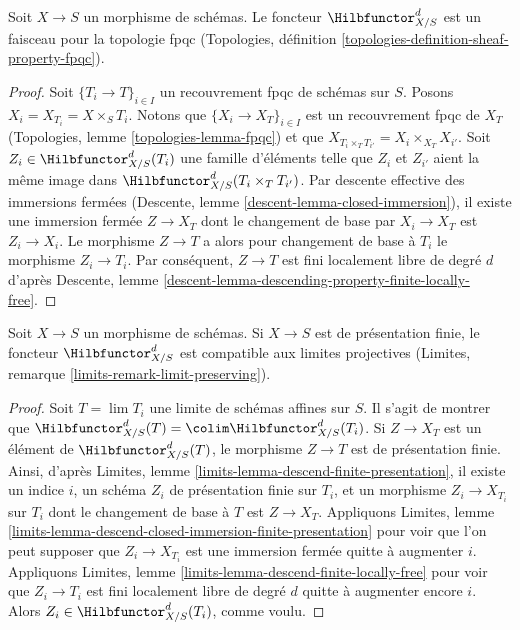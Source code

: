 \begin{lemma}
\label{lemma-hilb-d-sheaf}
Soit $X \to S$ un morphisme de schémas. Le foncteur $\Hilbfunctor^d_{X/S}$
est un faisceau pour la topologie fpqc
(Topologies, définition \ref{topologies-definition-sheaf-property-fpqc}).
\end{lemma}

\begin{proof}
Soit $\{T_i \to T\}_{i \in I}$ un recouvrement fpqc de schémas sur $S$.
Posons $X_i = X_{T_i} = X \times_S T_i$.
Notons que $\{X_i \to X_T\}_{i \in I}$ est un recouvrement fpqc de
$X_T$ (Topologies, lemme \ref{topologies-lemma-fpqc})
et que $X_{T_i \times_T T_{i'}} = X_i \times_{X_T} X_{i'}$.
Soit $Z_i \in \Hilbfunctor^d_{X/S}(T_i)$ une famille
d'éléments telle que $Z_i$ et $Z_{i'}$ aient la même image dans
$\Hilbfunctor^d_{X/S}(T_i \times_T T_{i'})$. Par descente effective
des immersions fermées (Descente, lemme \ref{descent-lemma-closed-immersion}),
il existe une immersion fermée $Z \to X_T$ dont le changement de base par
$X_i \to X_T$ est $Z_i \to X_i$. Le morphisme $Z \to T$
a alors pour changement de base à $T_i$ le morphisme
$Z_i \to T_i$. Par conséquent, $Z \to T$ est fini localement libre de degré $d$
d'après Descente, lemme \ref{descent-lemma-descending-property-finite-locally-free}.
\end{proof}

\begin{lemma}
\label{lemma-hilb-d-limit-preserving}
Soit $X \to S$ un morphisme de schémas. Si $X \to S$ est
de présentation finie, le foncteur $\Hilbfunctor^d_{X/S}$
est compatible aux limites projectives (Limites, remarque \ref{limits-remark-limit-preserving}).
\end{lemma}

\begin{proof}
Soit $T = \lim T_i$ une limite de schémas affines sur $S$. Il s'agit de montrer
que $\Hilbfunctor^d_{X/S}(T) = \colim \Hilbfunctor^d_{X/S}(T_i)$.
Si $Z \to X_T$ est un élément de $\Hilbfunctor^d_{X/S}(T)$,
le morphisme $Z \to T$ est de présentation finie. Ainsi, d'après
Limites, lemme \ref{limits-lemma-descend-finite-presentation},
il existe un indice $i$, un schéma $Z_i$ de présentation finie sur $T_i$,
et un morphisme $Z_i \to X_{T_i}$ sur $T_i$ dont le changement de base à $T$
est $Z \to X_T$. Appliquons Limites, lemme
\ref{limits-lemma-descend-closed-immersion-finite-presentation}
pour voir que l'on peut supposer que $Z_i \to X_{T_i}$ est une immersion fermée
quitte à augmenter $i$.
Appliquons Limites, lemme \ref{limits-lemma-descend-finite-locally-free}
pour voir que $Z_i \to T_i$ est fini localement libre de degré $d$
quitte à augmenter encore $i$.
Alors $Z_i \in \Hilbfunctor^d_{X/S}(T_i)$, comme voulu.
\end{proof}

